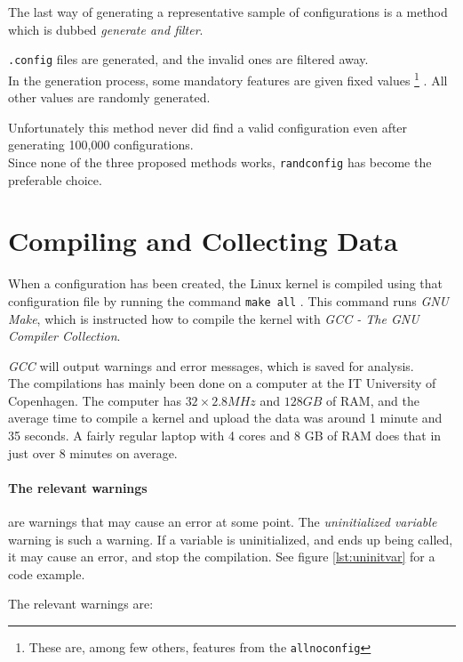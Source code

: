 \documentclass[a4paper,11pt]{report}
\newcommand{\textcode}[1]{
    \fboxsep=1pt
    \texttt{\colorbox{gray!20}{#1}}
}
\begin{document}
The last way of generating a representative sample of configurations is a 
method which is dubbed \emph{generate and filter}. 

\texttt{.config} files are generated, and the invalid ones are 
filtered away. 
\\

In the generation process, some mandatory features are given fixed values
    \footnote{These are, among few others, features from the 
    \texttt{allnoconfig}}
. All other values are randomly generated.

Unfortunately this method never did find a valid configuration even after 
generating 100,000 configurations.
\\

Since none of the three proposed methods works, \texttt{randconfig} has become 
the preferable choice.


\section{Compiling and Collecting Data}
When a configuration has been created, the Linux kernel is compiled using 
that configuration file by running the command \textcode{make all}. This 
command runs \emph{GNU Make}, which is instructed how to compile the kernel with
\emph{GCC - The GNU Compiler Collection}.

\emph{GCC} will output warnings and error messages, which is saved for analysis.
\\

The compilations has mainly been done on a computer at the IT University 
of Copenhagen. The computer has $32\times2.8 MHz$ and $128 GB$ of RAM, and the 
average time to compile a kernel and upload the data was around 1 minute and 35 
seconds. A fairly regular laptop with 4 cores and 8 GB of RAM does that in just 
over 8 minutes on average. 
\\


\iffalse %
    \paragraph{The relevant warnings}
are warnings that may cause an error at some point. The \emph{uninitialized 
variable} warning is such a warning. If a variable is uninitialized, and ends 
up being called, it may cause an error, and stop the compilation. See figure 
\ref{lst:uninitvar} for a code example.

The relevant warnings are:
\end{document}
